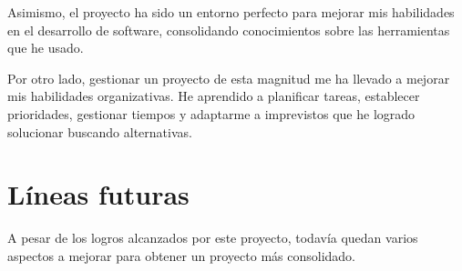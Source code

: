 Asimismo, el proyecto ha sido un entorno perfecto para mejorar mis habilidades en el desarrollo de software, consolidando conocimientos sobre las herramientas que he usado.

Por otro lado, gestionar un proyecto de esta magnitud me ha llevado a mejorar mis habilidades organizativas. He aprendido a planificar tareas, establecer prioridades, gestionar tiempos y adaptarme a imprevistos que he logrado solucionar buscando alternativas.

\section{Líneas futuras}
\label{sec:LineasFuturas}
A pesar de los logros alcanzados por este proyecto, todavía quedan varios aspectos a mejorar para obtener un proyecto más consolidado.

